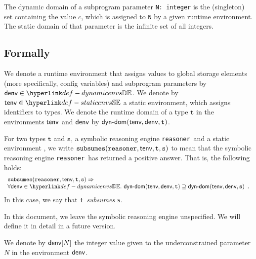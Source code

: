 \documentclass{book}
\newcommand\dynamicdomain[0]{\textsf{dyn-dom}}
\newcommand\vt[0]{\texttt{t}}
\newcommand\vs[0]{\texttt{s}}
\begin{document}
  The dynamic domain of a subprogram parameter \texttt{N: integer} is the (singleton) set containing the value $c$,
  which is assigned to \texttt{N} by a given runtime environment. The static domain of that parameter
  is the infinite set of all integers.



\begin{emptyformal}
      \subsection{Formally}
      \newcommand\subsumes[0]{\texttt{subsumes}}
      \newcommand\reasoner[0]{\texttt{reasoner}}

      We denote a runtime environment that assigns values to global storage elements (more specifically, config variables)
      and subprogram parameters by $\denv \in \dynamicenvs$.
      We denote by $\tenv \in \staticenvs$ a static environment, which assigns identifiers to types.
      We denote the runtime domain of a type $\vt$ in the environments $\textsf{tenv}$ and $\textsf{denv}$ by $\dynamicdomain(\tenv, \denv, \vt)$.

      For two types $\vt$ and $\vs$, a symbolic reasoning engine \reasoner\ and a static environment \tenv,
      we write $\subsumes(\reasoner, \tenv, \vt, \vs)$ to mean that the symbolic reasoning
      engine \reasoner\ has returned a positive answer. That is, the following holds:
      \[
        \begin{array}{l}
        \subsumes(\reasoner, \tenv, \vt, \vs) \Rightarrow \\
       \forall \denv\in\dynamicenvs.\ \dynamicdomain(\tenv, \denv, \vt) \supseteq \dynamicdomain(\tenv, \denv, \vs) \enspace.
        \end{array}
      \]
      In this case, we say that \vt\ \emph{subsumes} \vs.

      In this document, we leave the symbolic reasoning engine unspecified. We will define it in detail in a future version.

We denote by $\textsf{denv}[N]$ the integer value given to the underconstrained parameter $N$ in the environment $\textsf{denv}$.


\end{emptyformal}
\end{document}
